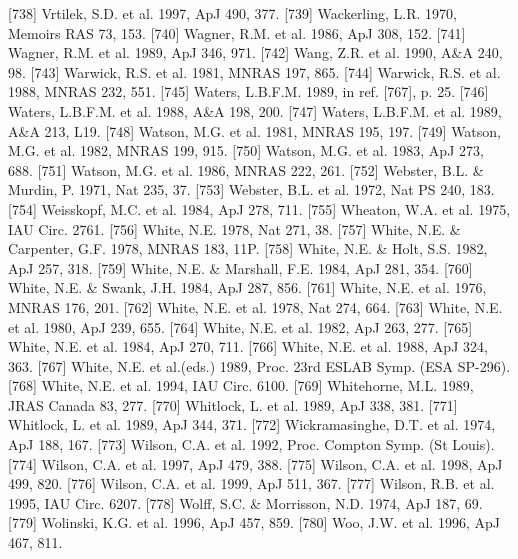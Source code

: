 \documentclass{aa}
\begin{document}
\begin{thebibliography}{}
\bibitem[]{}[738] Vrtilek, S.D. et al. 1997, ApJ 490, 377.
\bibitem[]{}[739] Wackerling, L.R. 1970, Memoirs RAS 73, 153.
\bibitem[]{}[740] Wagner, R.M. et al. 1986, ApJ 308, 152.
\bibitem[]{}[741] Wagner, R.M. et al. 1989, ApJ 346, 971.
\bibitem[]{}[742] Wang, Z.R. et al. 1990, A\&A 240, 98.
\bibitem[]{}[743] Warwick, R.S. et al. 1981, MNRAS 197, 865.
\bibitem[]{}[744] Warwick, R.S. et al. 1988, MNRAS 232, 551.
\bibitem[]{}[745] Waters, L.B.F.M. 1989, in ref. [767], p. 25.
\bibitem[]{}[746] Waters, L.B.F.M. et al. 1988, A\&A 198, 200.
\bibitem[]{}[747] Waters, L.B.F.M. et al. 1989, A\&A 213, L19.
\bibitem[]{}[748] Watson, M.G. et al. 1981, MNRAS 195, 197.
\bibitem[]{}[749] Watson, M.G. et al. 1982, MNRAS 199, 915.
\bibitem[]{}[750] Watson, M.G. et al. 1983, ApJ 273, 688.
\bibitem[]{}[751] Watson, M.G. et al. 1986, MNRAS 222, 261.
\bibitem[]{}[752] Webster, B.L. \& Murdin, P. 1971, Nat 235, 37.
\bibitem[]{}[753] Webster, B.L. et al. 1972, Nat PS 240, 183.
\bibitem[]{}[754] Weisskopf, M.C. et al. 1984, ApJ 278, 711.
\bibitem[]{}[755] Wheaton, W.A. et al. 1975, IAU Circ. 2761.
\bibitem[]{}[756] White, N.E. 1978, Nat 271, 38.
\bibitem[]{}[757] White, N.E. \& Carpenter, G.F. 1978, MNRAS 183, 11P.
\bibitem[]{}[758] White, N.E. \& Holt, S.S. 1982, ApJ 257, 318.
\bibitem[]{}[759] White, N.E. \& Marshall, F.E. 1984, ApJ 281, 354.
\bibitem[]{}[760] White, N.E. \& Swank, J.H. 1984, ApJ 287, 856.
\bibitem[]{}[761] White, N.E. et al. 1976, MNRAS 176, 201.
\bibitem[]{}[762] White, N.E. et al. 1978, Nat 274, 664.
\bibitem[]{}[763] White, N.E. et al. 1980, ApJ 239, 655.
\bibitem[]{}[764] White, N.E. et al. 1982, ApJ 263, 277.
\bibitem[]{}[765] White, N.E. et al. 1984, ApJ 270, 711.
\bibitem[]{}[766] White, N.E. et al. 1988, ApJ 324, 363.
\bibitem[]{}[767] White, N.E. et al.(eds.) 1989, Proc. 23rd ESLAB Symp. (ESA SP-296).
\bibitem[]{}[768] White, N.E. et al. 1994, IAU Circ. 6100.
\bibitem[]{}[769] Whitehorne, M.L. 1989, JRAS Canada 83, 277.
\bibitem[]{}[770] Whitlock, L. et al. 1989, ApJ 338, 381.
\bibitem[]{}[771] Whitlock, L. et al. 1989, ApJ 344, 371.
\bibitem[]{}[772] Wickramasinghe, D.T. et al. 1974, ApJ 188, 167.
\bibitem[]{}[773] Wilson, C.A. et al. 1992, Proc. Compton Symp. (St Louis).
\bibitem[]{}[774] Wilson, C.A. et al. 1997, ApJ 479, 388.
\bibitem[]{}[775] Wilson, C.A. et al. 1998, ApJ 499, 820.
\bibitem[]{}[776] Wilson, C.A. et al. 1999, ApJ 511, 367.
\bibitem[]{}[777] Wilson, R.B. et al. 1995, IAU Circ. 6207.
\bibitem[]{}[778] Wolff, S.C. \& Morrisson, N.D. 1974, ApJ 187, 69.
\bibitem[]{}[779] Wolinski, K.G. et al. 1996, ApJ 457, 859.
\bibitem[]{}[780] Woo, J.W. et al. 1996, ApJ 467, 811.

\end{thebibliography}
\end{document}
